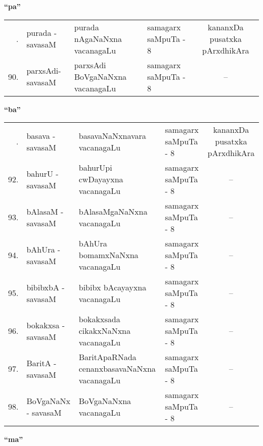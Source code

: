 \centerline{\bf ``pa''}

{\renewcommand{\arraystretch}{1.3}
\begin{longtable}{rl>{\raggedright}p{5.5cm}lc}
\hline
\endfirsthead
\hline
\endhead
\hline
\endfoot
\endlastfoot
89. & purada - savasaM &  purada nAgaNaNxna vacanagaLu & samagarx saMpuTa - 8 & kananxDa pusatxka pArxdhikAra\\
90. & parxsAdi- savasaM & parxsAdi BoVgaNaNxna vacanagaLu & samagarx saMpuTa - 8 & --\\
\hline
\end{longtable}}

\centerline{\bf ``ba''}

{\renewcommand{\arraystretch}{1.3}
\begin{longtable}{rl>{\raggedright}p{5.5cm}lc}
\hline
\endfirsthead
\hline
\endhead
\hline
\endfoot
\endlastfoot
91. & basava - savasaM & basavaNaNxnavara vacanagaLu & samagarx saMpuTa - 8 & kananxDa pusatxka pArxdhikAra\\
92. & bahurU - savasaM & bahurUpi cwDayayxna vacanagaLu & samagarx saMpuTa - 8 & --\\
93. & bAlasaM - savasaM & bAlasaMgaNaNxna vacanagaLu & samagarx saMpuTa - 8 & --\\
94. & bAhUra - savasaM & bAhUra bomamxNaNxna vacanagaLu & samagarx saMpuTa - 8 & --\\
95. & bibibxbA - savasaM & bibibx bAcayayxna vacanagaLu & samagarx saMpuTa - 8 & --\\
96. & bokakxsa - savasaM & bokakxsada cikakxNaNxna vacanagaLu & samagarx saMpuTa - 8 & --\\
97. & BaritA - savasaM & BaritApaRNada cenanxbasavaNaNxna vacanagaLu & samagarx saMpuTa - 8 & --\\
98. & BoVgaNaNx - savasaM & BoVgaNaNxna vacanagaLu & samagarx saMpuTa - 8 & --\\
\hline
\end{longtable}}

\centerline{\bf ``ma''}

